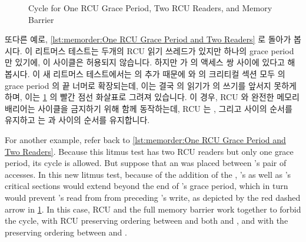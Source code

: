 \begin{figure}[tbp]
\centering
{}
\caption{Cycle for One RCU Grace Period, Two RCU Readers, and Memory Barrier}
\label{fig:memorder:Cycle for One RCU Grace Period; Two RCU Readers; and Memory Barrier}
\end{figure}

또다른 예로,
\cref{lst:memorder:One RCU Grace Period and Two Readers}
로 돌아가 봅시다.
이 리트머스 테스트는 두개의 RCU 읽기 쓰레드가 있지만 하나의 grace period 만
있기에, 이 사이클은 허용되지 않습니다.
하지만  가  의 액세스 쌍 사이에 있다고 해봅시다.
이 새 리트머스 테스트에서는  의 추가 때문에  와 
의 크리티컬 섹션 모두  의 grace period 의 끝 너머로 확장되는데, 이는
결국  의  읽기가  의 쓰기를 앞서지 못하게 하며, 이는
\cref{fig:memorder:Cycle for One RCU Grace Period; Two RCU Readers; and Memory Barrier}
의 빨간 점선 화살표로 그려져 있습니다.
이 경우, RCU 와 완전한 메모리 배리어는 사이클을 금지하기 위해 함께 동작하는데,
RCU 는 ,  그리고  사이의 순서를 유지하고
 는  과  사이의 순서를 유지합니다.

\iffalse

For another example, refer back to
\cref{lst:memorder:One RCU Grace Period and Two Readers}.
Because this litmus test has two RCU readers but only one grace period,
its cycle is allowed.
But suppose that an  was placed between 's
pair of accesses.
In this new litmus test, because of the addition of the ,
's as well as 's critical sections would extend beyond the
end of 's grace period, which in turn would prevent 's
read from  from preceding 's write, as depicted by the
red dashed arrow in
\cref{fig:memorder:Cycle for One RCU Grace Period; Two RCU Readers; and Memory Barrier}.
In this case, RCU and the full memory barrier work together to forbid
the cycle, with RCU preserving ordering between  and both
 and , and with the  preserving
ordering between  and .

